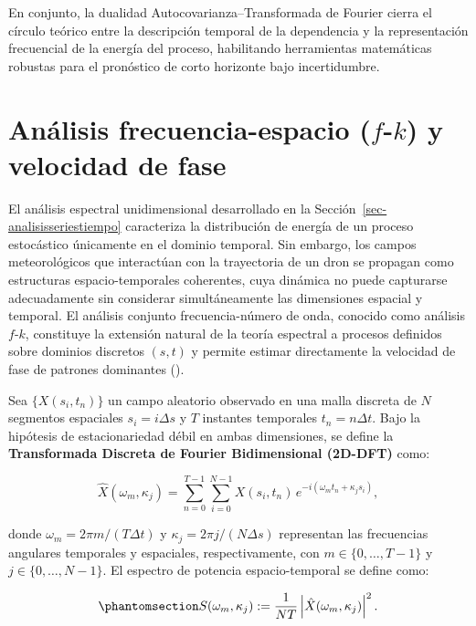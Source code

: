 \documentclass[
  spanish,
  us-letterpaper,
]{scrreprt}
\numberwithin{equation}{section}
\begin{document}
En conjunto, la dualidad Autocovarianza--Transformada de Fourier cierra
el círculo teórico entre la descripción temporal de la dependencia y la
representación frecuencial de la energía del proceso, habilitando
herramientas matemáticas robustas para el pronóstico de corto horizonte
bajo incertidumbre.

\section{\texorpdfstring{Análisis frecuencia-espacio (\(f\)-\(k\)) y
velocidad de
fase}{Análisis frecuencia-espacio (f-k) y velocidad de fase}}\label{sec-analisisfk}

El análisis espectral unidimensional desarrollado en la
Sección~\ref{sec-analisisseriestiempo} caracteriza la distribución de
energía de un proceso estocástico únicamente en el dominio temporal. Sin
embargo, los campos meteorológicos que interactúan con la trayectoria de
un dron se propagan como estructuras espacio-temporales coherentes, cuya
dinámica no puede capturarse adecuadamente sin considerar
simultáneamente las dimensiones espacial y temporal. El análisis
conjunto frecuencia-número de onda, conocido como análisis \(f\)-\(k\),
constituye la extensión natural de la teoría espectral a procesos
definidos sobre dominios discretos \((s,t)\) y permite estimar
directamente la velocidad de fase de patrones dominantes
().

Sea \(\{X(s_i, t_n)\}\) un campo aleatorio observado en una malla
discreta de \(N\) segmentos espaciales \(s_i = i\Delta s\) y \(T\)
instantes temporales \(t_n = n\Delta t\). Bajo la hipótesis de
estacionariedad débil en ambas dimensiones, se define la
\textbf{Transformada Discreta de Fourier Bidimensional (2D-DFT)} como:

\[
\hat{X}(\omega_m, \kappa_j) = \sum_{n=0}^{T-1} \sum_{i=0}^{N-1} X(s_i, t_n) \, e^{-i(\omega_m t_n + \kappa_j s_i)},
\]

donde \(\omega_m = 2\pi m / (T\Delta t)\) y
\(\kappa_j = 2\pi j / (N\Delta s)\) representan las frecuencias
angulares temporales y espaciales, respectivamente, con
\(m \in \{0,\dots,T-1\}\) y \(j \in \{0,\dots,N-1\}\). El espectro de
potencia espacio-temporal se define como:

\begin{equation}\phantomsection\label{eq-espectro}{
S(\omega_m, \kappa_j) := \frac{1}{NT} \left| \hat{X}(\omega_m, \kappa_j) \right|^2.
}\end{equation}
\end{document}
